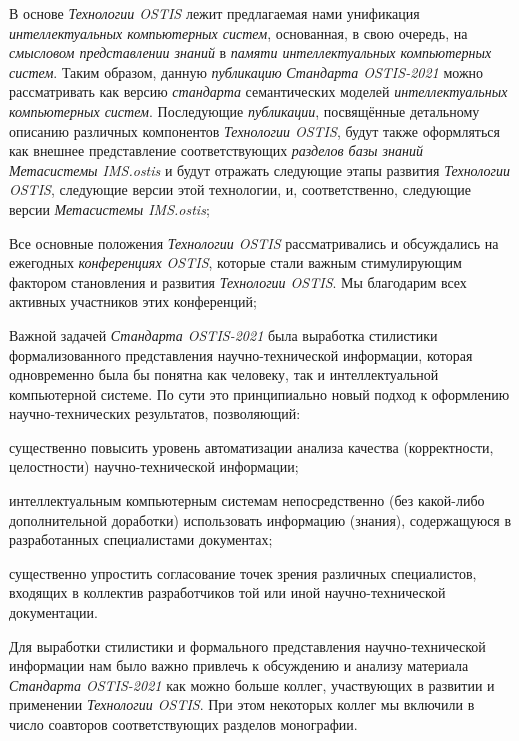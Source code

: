 \begin{SCn}
{\begin{scnitemize}
		\item В основе \textit{Технологии OSTIS} лежит предлагаемая нами унификация \textit{интеллектуальных компьютерных систем}, основанная, в свою очередь, на \textit{смысловом представлении знаний} в \textit{памяти интеллектуальных компьютерных систем}. Таким образом, данную \textit{публикацию} \textit{Стандарта OSTIS-2021} можно рассматривать как версию \textit{стандарта} семантических моделей \textit{интеллектуальных компьютерных систем}. Последующие \textit{публикации}, посвящённые детальному описанию различных компонентов \textit{Технологии OSTIS}, будут также оформляться как внешнее представление соответствующих \textit{разделов базы знаний} \scnbigspace \textit{Метасистемы IMS.ostis} и будут отражать следующие этапы развития \textit{Технологии OSTIS}, следующие версии этой технологии, и, соответственно, следующие версии \textit{Метасистемы IMS.ostis};
		\item Все основные положения \textit{Технологии OSTIS} рассматривались и обсуждались на ежегодных \textit{конференциях OSTIS}, которые стали важным стимулирующим фактором становления и развития \textit{Технологии OSTIS}. Мы благодарим всех активных участников этих конференций;
		\item Важной задачей \textit{Стандарта OSTIS-2021} была выработка стилистики формализованного представления научно-технической информации, которая одновременно была бы понятна как человеку, так и интеллектуальной компьютерной системе. По сути это принципиально новый подход к оформлению научно-технических результатов, позволяющий:
		\begin{scnitemizeii}
			\item существенно повысить уровень автоматизации анализа качества (корректности, целостности) научно-технической информации;
			\item интеллектуальным компьютерным системам непосредственно (без какой-либо дополнительной {} доработки) использовать информацию (знания), содержащуюся в разработанных специалистами документах;
			\item существенно упростить согласование точек зрения различных специалистов, входящих в коллектив разработчиков той или иной научно-технической документации.
		\end{scnitemizeii}
		\item Для выработки стилистики и формального представления научно-технической информации нам было важно привлечь к обсуждению и анализу материала \textit{Стандарта OSTIS-2021} как можно больше коллег, участвующих в развитии и применении \textit{Технологии OSTIS}. При этом некоторых коллег мы включили в число соавторов соответствующих разделов монографии.

\end{scnitemize}}
\end{SCn}
